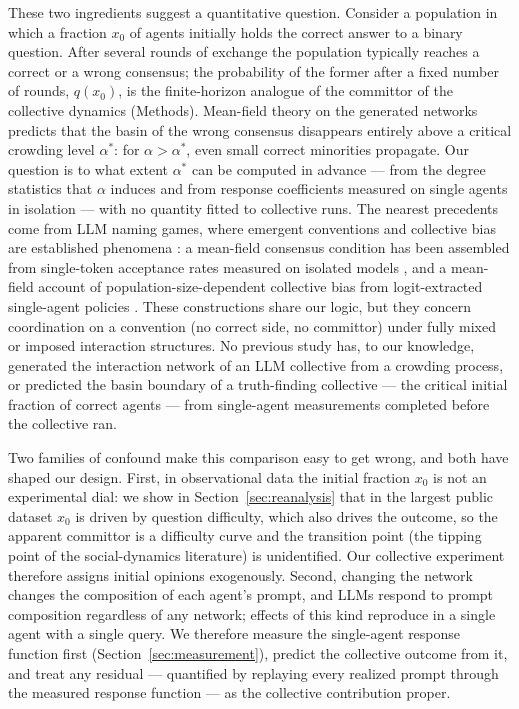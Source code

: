 \documentclass[9pt,twocolumn]{extarticle}
\newcommand{\astar}{\alpha^{*}}
\begin{document}
These two ingredients suggest a quantitative question. Consider a population
in which a fraction $x_0$ of agents initially holds the correct answer to a
binary question. After several rounds of exchange the population typically
reaches a correct or a wrong consensus; the probability of the former after
a fixed number of rounds, $q(x_0)$, is the finite-horizon analogue of the
committor of the collective dynamics (Methods). Mean-field theory on
the generated networks predicts that the basin of the wrong consensus
disappears entirely above a critical crowding level $\astar$: for
$\alpha > \astar$, even small correct minorities propagate. Our question is to
what extent $\astar$ can be computed in advance --- from the degree statistics
that $\alpha$ induces and from response coefficients measured on single agents
in isolation --- with no quantity fitted to collective runs. The nearest precedents come from LLM naming games, where emergent
conventions and collective bias are established phenomena
\citep{Ashery2025, Flint2026}: a mean-field consensus condition has been
assembled from single-token acceptance rates measured on isolated models
\citep{DeNobili2026}, and a mean-field account of population-size-dependent
collective bias from logit-extracted single-agent policies
\citep{Flint2026}. These constructions share our logic, but they concern
coordination on a convention (no correct side, no committor) under
fully mixed or imposed interaction structures. No previous study has, to our knowledge,
generated the interaction network of an LLM collective from a crowding
process, or predicted the basin boundary of a truth-finding collective ---
the critical initial fraction of correct agents --- from single-agent
measurements completed before the collective ran.

Two families of confound make this comparison easy to get wrong, and both have
shaped our design. First, in observational data the initial fraction $x_0$ is
not an experimental dial: we show in Section~\ref{sec:reanalysis} that in the
largest public dataset $x_0$ is driven by question difficulty, which also
drives the outcome, so the apparent committor is a difficulty curve and the transition point (the tipping point of the social-dynamics literature) is unidentified. Our collective experiment therefore assigns
initial opinions exogenously. Second, changing the network changes the
composition of each agent's prompt, and LLMs respond to prompt composition
regardless of any network; effects of this kind reproduce in a single agent
with a single query. We therefore measure the single-agent response function
first (Section~\ref{sec:measurement}), predict the collective outcome from it,
and treat any residual --- quantified by replaying every realized prompt
through the measured response function --- as the collective contribution proper.
\end{document}
